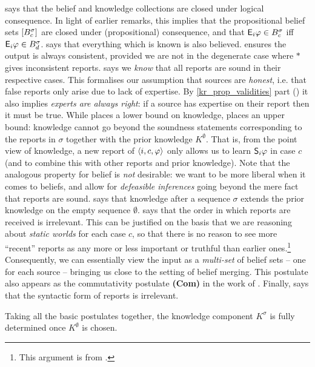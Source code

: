 \closure{} says that the belief and knowledge collections are closed under
logical consequence. In light of earlier remarks,
this implies that the propositional belief sets $\proppart{B^\sigma_c}$ are
closed under (propositional) consequence, and that $\E_i\phi \in B^\sigma_c$
iff $\E_i\phi \in B^\sigma_d$.
%
\containment{} says that everything which is known is also believed.
%
\consistency{} ensures the output is always consistent, provided
we are not in the degenerate case where $\ast$ gives inconsistent reports.
%
\soundness{} says we \emph{know} that all reports are sound in their respective
cases. This formalises our assumption that sources are \emph{honest}, i.e. that
false reports only arise due to lack of expertise. By \cref{kr_prop_validities}
part () it also implies \emph{experts are
always right}: if a source has expertise on their report then it must be true.
%
While \soundness{} places a lower bound on knowledge, \kbound{} places an upper
bound: knowledge cannot go beyond the soundness statements corresponding to the
reports in $\sigma$ together with the prior knowledge $K^\emptyset$. That is,
from the point view of knowledge, a new report of $\tuple{i, c, \phi}$ only
allows us to learn $\S_i\phi$ in case $c$ (and to combine this with other
reports and prior knowledge). Note that the analogous property for belief is
\emph{not} desirable: we want to be more liberal when it comes to beliefs, and
allow for \emph{defeasible inferences} going beyond the mere fact that reports
are sound.
%
\priorext{} says that knowledge after a sequence $\sigma$ extends the prior
knowledge on the empty sequence $\emptyset$.
%
\rearr{} says that the order in which reports are received is irrelevant. This
can be justified on the basis that we are reasoning about \emph{static worlds}
for each case $c$, so that there is no reason
to see more ``recent'' reports as any more or less important or truthful than
earlier ones.\footnote{This argument is from \cite{delgrande2006iterated}.}
Consequently, we can essentially view the input as a \emph{multi-set} of belief
sets -- one for each source -- bringing us close to the setting of belief
merging. This postulate also appears as the commutativity postulate
\textbf{(Com)} in the work of \textcite{schwind2020}.
%
Finally, \equivpost{} says that the syntactic form of reports is irrelevant.

Taking all the basic postulates together, the knowledge component $K^\sigma$ is
fully determined once $K^\emptyset$ is chosen.

